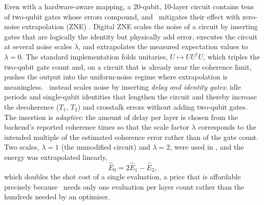 Even with a hardware-aware mapping, a 20-qubit, 10-layer circuit contains tens of two-qubit gates whose errors compound, and \deal\ mitigates their effect with zero-noise extrapolation (ZNE) \cite{temme2017errormitigation,kandala2019errormitigation}. Digital ZNE \cite{giurgicatiron2020digitalzne} scales the noise of a circuit by inserting gates that are logically the identity but physically add error, executes the circuit at several noise scales $\lambda$, and extrapolates the measured expectation values to $\lambda=0$. The standard implementation folds unitaries, $U\mapsto UU^{\dagger}U$, which triples the two-qubit gate count and, on a circuit that is already near the coherence limit, pushes the output into the uniform-noise regime where extrapolation is meaningless. \deal\ instead scales noise by inserting \emph{delay and identity gates}: idle periods and single-qubit identities that lengthen the circuit and thereby increase the decoherence ($T_{1}$, $T_{2}$) and crosstalk errors without adding two-qubit gates. The insertion is \emph{adaptive}: the amount of delay per layer is chosen from the backend's reported coherence times so that the scale factor $\lambda$ corresponds to the intended multiple of the estimated coherence error rather than of the gate count. Two scales, $\lambda=1$ (the unmodified circuit) and $\lambda=2$, were used in \cite{guo2025deal}, and the energy was extrapolated linearly,
\begin{equation}\label{eq:nisq:zne}
  \hat{E}_{0} = 2\hat{E}_{1} - \hat{E}_{2},
\end{equation}
which doubles the shot cost of a single evaluation, a price that is affordable precisely because \deal\ needs only one evaluation per layer count rather than the hundreds needed by an optimiser.

